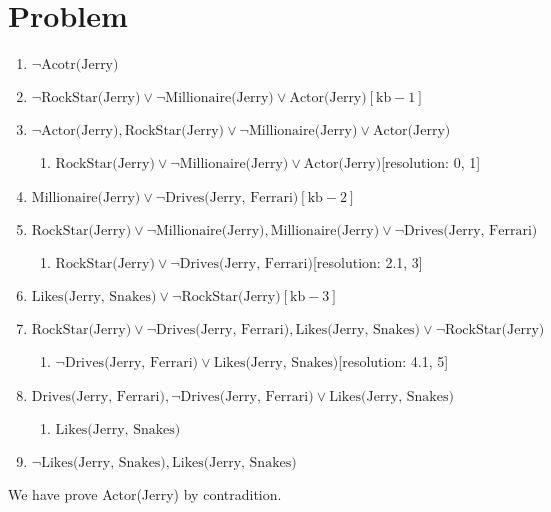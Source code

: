 \documentclass[11pt, oneside]{article}      %
\begin{document}
\section {Problem}
\begin{enumerate}[start=0] %
  \item $\neg \text{Acotr(Jerry)}$
  \item $\neg \text{RockStar(Jerry)}\lor \neg \text{Millionaire(Jerry)}\lor \text{Actor(Jerry)}[\text{kb} - 1]$
  \item $\neg \text{Actor(Jerry)}, \text{RockStar(Jerry)}\lor \neg \text{Millionaire(Jerry)}\lor \text{Actor(Jerry)}$
    \begin{enumerate}[1. ] %
      \item $\text{RockStar(Jerry)}\lor \neg \text{Millionaire(Jerry)}\lor \text{Actor(Jerry)}$[resolution: 0, 1]
    \end{enumerate}
  \item $\text{Millionaire(Jerry)}\lor \neg \text{Drives(Jerry, Ferrari)}[\text{kb} - 2]$
  \item $\text{RockStar(Jerry)}\lor \neg \text{Millionaire(Jerry)}, \text{Millionaire(Jerry)}\lor \neg \text{Drives(Jerry, Ferrari)}$
    \begin{enumerate}[1. ] %
      \item $\text{RockStar(Jerry)}\lor \neg \text{Drives(Jerry, Ferrari)}$[resolution: 2.1, 3]
    \end{enumerate}
  \item $\text{Likes(Jerry, Snakes)}\lor \neg \text{RockStar(Jerry)}[\text{kb} - 3]$
  \item $\text{RockStar(Jerry)}\lor \neg \text{Drives(Jerry, Ferrari)}, \text{Likes(Jerry, Snakes)}\lor \neg \text{RockStar(Jerry)}$
    \begin{enumerate}[1. ] %
      \item $\neg \text{Drives(Jerry, Ferrari)}\lor \text{Likes(Jerry, Snakes)}$[resolution: 4.1, 5]
    \end{enumerate}
  \item $\text{Drives(Jerry, Ferrari)}, \neg \text{Drives(Jerry, Ferrari)}\lor \text{Likes(Jerry, Snakes)}$
    \begin{enumerate}[1. ] %
      \item $\text{Likes(Jerry, Snakes)}$
    \end{enumerate}
  \item $\neg \text{Likes(Jerry, Snakes)}, \text{Likes(Jerry, Snakes)}$
\end{enumerate}

We have prove Actor(Jerry) by contradition.
\end{document}

